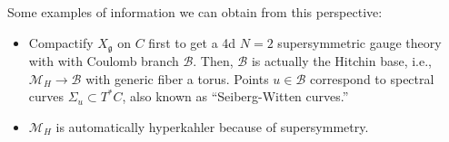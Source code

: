 Some examples of information we can obtain from this perspective:
\begin{itemize}
\item Compactify $X_{\mathfrak{g}}$ on $C$ first to get a 4d $N=2$ supersymmetric
gauge theory with with Coulomb branch $\mathcal{B}$. Then, $\mathcal{B}$
is actually the Hitchin base, i.e., $\mathcal{M}_{H}\rightarrow\mathcal{B}$
with generic fiber a torus. Points $u\in\mathcal{B}$ correspond to
spectral curves $\Sigma_{u}\subset T^{*}C$, also known as ``Seiberg-Witten
curves.''
\item $\mathcal{M}_{H}$ is automatically hyperkahler because of supersymmetry.
\end{itemize}